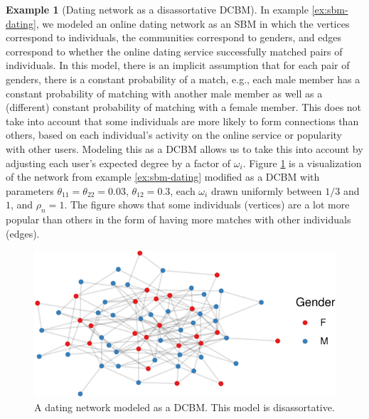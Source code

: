 \documentclass[
  12pt,
]{article}
\theoremstyle{definition}
\theoremstyle{definition}
\newtheorem{example}{Example}[section]
\theoremstyle{definition}
\theoremstyle{definition}
\theoremstyle{remark}
\begin{document}
\begin{example}[Dating network as a disassortative DCBM]
\label{ex:dcbm-dating}
In example \ref{ex:sbm-dating}, we modeled an online dating network as an SBM in which the vertices correspond to individuals, the communities correspond to genders, and edges correspond to whether the online dating service successfully matched pairs of individuals. 
In this model, there is an implicit assumption that for each pair of genders, there is a constant probability of a match, e.g., each male member has a constant probability of matching with another male member as well as a (different) constant probability of matching with a female member. 
This does not take into account that some individuals are more likely to form connections than others, based on each individual's activity on the online service or popularity with other users. 
Modeling this as a DCBM allows us to take this into account by adjusting each user's expected degree by a factor of $\omega_i$. 
Figure \ref{fig:dating-dcbm} is a visualization of the network from example \ref{ex:sbm-dating} modified as a DCBM with parameters $\theta_{11} = \theta_{22} = 0.03$, $\theta_{12} = 0.3$, each $\omega_i$ drawn uniformly between $1/3$ and $1$, and $\rho_n = 1$. 
The figure shows that some individuals (vertices) are a lot more popular than others in the form of having more matches with other individuals (edges). 

\begin{figure}[H]

{\centering \includegraphics{draft_files/figure-latex/dating-dcbm-1} 

}

\caption{A dating network modeled as a DCBM. This model is disassortative.}\label{fig:dating-dcbm}
\end{figure}
\end{example}
\end{document}
